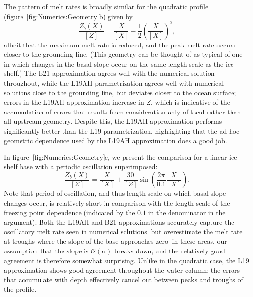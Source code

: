 \documentclass[openacc]{rsproca_new}%
\newcommand{\order}[1]{\mathcal{O}(#1)}
\begin{document}
The pattern of melt rates is broadly similar for the quadratic profile (figure~\ref{fig:Numerics:Geometry}b) given by
\begin{equation}\label{E:Numerics:QuadraticGeometry}
\frac{Z_b(X)}{\left[Z\right]}= \frac{X}{\left[X\right]} - \frac{1}{2}\left(\frac{X}{\left[X\right]}\right)^2,
\end{equation}
albeit that the maximum melt rate is reduced, and the peak melt rate occurs closer to the grounding line. (This geometry can be thought of as typical of one in which changes in the basal slope occur on the same length scale as the ice shelf.) The B21 approximation agrees well with the numerical solution throughout, while the L19AH parametrization agrees well with numerical solutions close to the grounding line, but deviates closer to the ocean surface; errors in the L19AH approximation increase in $Z$, which is indicative of the accumulation of errors that results from consideration only of local rather than all upstream geometry. Despite this, the L19AH approximation performs significantly better than the L19 parametrization, highlighting that the ad-hoc geometric dependence used by the L19AH approximation does a good job. 

In figure~\ref{fig:Numerics:Geometry}c, we present the comparison for a linear ice shelf base with a periodic oscillation superimposed:
\begin{equation}\label{E:Numerics:SinusoidalGeometry}
\frac{Z_b(X)}{\left[Z\right]}= \frac{X}{\left[X\right]} + \frac{30}{\left[Z\right]}\sin\left(\frac{2\pi}{0.1}\frac{ X}{\left[X\right]}\right).
\end{equation}
Note that period of oscillation, and thus length scale on which basal slope changes occur, is relatively short in comparison with the length scale of the freezing point dependence (indicated by the $0.1$ in the denominator in the argument). Both the L19AH and B21 approximations accurately capture the oscillatory melt rate seen in numerical solutions, but overestimate the melt rate at troughs where the slope of the base approaches zero; in these areas, our assumption that the slope is $\order{\alpha}$ breaks down, and the relatively good agreement is therefore somewhat surprising. Unlike in the quadratic case, the L19 approximation shows good agreement throughout the water column: the errors that accumulate with depth effectively cancel out between peaks and troughs of the profile.  
\end{document}
